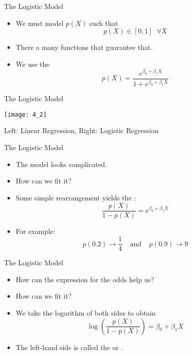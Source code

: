\documentclass[mathserif, aspectratio=169]{beamer}
\begin{document}
\begin{frame}{The Logistic Model}
	\begin{itemize}
		\item We must model $p(X)$ such that
			\[ p(X) \in \left[0, 1 \right] \;\;\forall X \]
		\item There a many functions that guarantee that.
		\item We use the 
			\[ p(X) = \frac{e^{\beta_0 + \beta_1 X}}{ 1 + e^{\beta_0 + \beta_1 X}} \]
	\end{itemize}
\end{frame}

\begin{frame}{The Logistic Model}
	\begin{center}
		\texttt{[image: 4\_2]}

	Left: Linear Regression,
	Right: Logistic Regression
	\end{center}
\end{frame}

\begin{frame}{The Logistic Model}
	\begin{itemize}
		\item The model looks complicated.
		\item How can we fit it?
		\item Some simple rearrangement yields the :
			\[ \frac{p(X)}{1 - p(X)} = e^{\beta_0 +\beta_1 X} \]
		\item For example:
			\[ p(0.2)\rightarrow\frac{1}{4}\;\;\;\;\text{and}\;\;\;\; p(0.9)\rightarrow 9 \]
	\end{itemize}
\end{frame}

\begin{frame}{The Logistic Model}
	\begin{itemize}
		\item How can the expression for the odds help us?
		\item How can we fit it?
		\item We take the logarithm of both sides to obtain
			\[ \log\left( \frac{p(X)}{1 - p(X)}\right)  = \beta_0 + \beta_1 X \]
		\item The left-hand side is called the  or .
	\end{itemize}
\end{frame}
\end{document}
